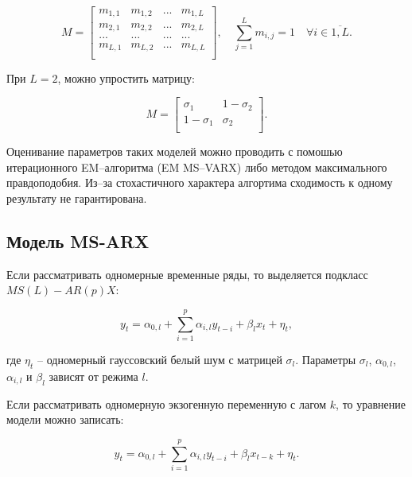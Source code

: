 \documentclass[a4paper,14pt]{extreport}
\begin{document}
	\begin{equation}
		M=
		\left[ {\begin{array}{cccc}
			m_{1,1} & m_{1,2} & ... & m_{1,L} \\
			m_{2,1} & m_{2,2} & ... & m_{2,L} \\
			... & ... & ... & ... \\
			m_{L,1} & m_{L,2} & ... & m_{L,L} \\
			\end{array} } \right]
		, \quad
		\sum_{j=1}^{L} m_{i,j} = 1 \quad \forall i \in \overline{1,L}.
		\label{eq:M_matrix}
	\end{equation}
	
	При $L=2$, можно упростить матрицу:
	
	\begin{equation}
	M=
	\left[ {\begin{array}{cc}
		\sigma_{1} & 1-\sigma_{2} \\
		1-\sigma_{1} & \sigma_{2} \\
		\end{array} } \right].
	\label{eq:M_simplified}
	\end{equation}
	
	Оценивание параметров таких моделей можно проводить с помошью итерационного EM--алгоритма (EM MS--VARX) \cite{malNovopMSVARX} либо методом максимального правдоподобия. Из--за стохастичного характера алгортима сходимость к одному результату не гарантирована.
	
	
	\subsection{Модель MS-ARX}
	
	Если рассматривать одномерные временные ряды, то выделяется подкласс $MS(L)-AR(p)X$:
	
	\begin{equation}  
	y_{t} = \alpha_{0,l} + \sum_{i=1}^{p} \alpha_{i,l} y_{t-i} + \beta_{l} x_{t} + \eta_{t},
	\label{eq:msarx_base}
	\end{equation}
	
	где $\eta_{t}$ -- одномерный гауссовский белый шум с матрицей $\sigma_{l}$. Параметры $\sigma_{l}$, $\alpha_{0,l}$, $\alpha_{i,l}$ и $\beta_{l}$ зависят от режима $l$.
	
	Если рассматривать одномерную экзогенную переменную с лагом $k$, то уравнение модели можно записать:
	
	\begin{equation}  
	y_{t} = \alpha_{0,l} + \sum_{i=1}^{p} \alpha_{i,l} y_{t-i} + \beta_{l} x_{t-k} + \eta_{t}.
	\label{eq:gen-msarx}
	\end{equation}
	
\end{document}
